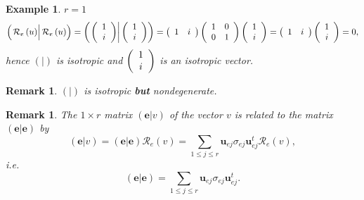 \documentclass[aps,preprint]{revtex4}%
\newtheorem{example}[theorem]{Example}
\newtheorem{remark}[theorem]{Remark}
\begin{document}
\begin{example}
$r=1$%
\[
\left(  \left.  \overset{}{\mathcal{R}_{e}\left(  u\right)  }\right\vert
\mathcal{R}_{e}\left(  u\right)  \right)  =\left(  \left.  \left(
\begin{array}
[c]{c}%
1\\
i
\end{array}
\right)  \right\vert \left(
\begin{array}
[c]{c}%
1\\
i
\end{array}
\right)  \right)  =\left(
\begin{array}
[c]{cc}%
1 & i
\end{array}
\right)  \left(
\begin{array}
[c]{cc}%
1 & 0\\
0 & 1
\end{array}
\right)  \left(
\begin{array}
[c]{c}%
1\\
i
\end{array}
\right)  =\left(
\begin{array}
[c]{cc}%
1 & i
\end{array}
\right)  \left(
\begin{array}
[c]{c}%
1\\
i
\end{array}
\right)  =0,
\]
hence $\left(  \left.  {}\right\vert \right)  $ is \emph{isotropic} and
$\left(
\begin{array}
[c]{c}%
1\\
i
\end{array}
\right)  $ is an isotropic vector.
\end{example}

\begin{remark}
$\left(  \left.  {}\right\vert \right)  $ is \emph{isotropic \textbf{but}
nondegenerate. }
\end{remark}

\begin{remark}
The $1\times r$ matrix $\left(  \left.  \mathbf{e}\right\vert v\right)  $ of
the vector $v$ is related to the matrix $\left(  \left.  \mathbf{e}\right\vert
\mathbf{e}\right)  $ by
\begin{equation}
\left(  \left.  \mathbf{e}\right\vert v\right)  =\left(  \left.
\mathbf{e}\right\vert \mathbf{e}\right)  \mathcal{R}_{e}\left(  v\right)
=\sum_{1\leq j\leq r}\mathbf{u}_{ej}\sigma_{ej}\mathbf{u}_{ej}^{t}%
\mathcal{R}_{e}\left(  v\right)  ,
\end{equation}
i.e.
\begin{equation}
\left(  \left.  \mathbf{e}\right\vert \mathbf{e}\right)  =\sum_{1\leq j\leq
r}\mathbf{u}_{ej}\sigma_{ej}\mathbf{u}_{ej}^{t}.
\end{equation}

\end{remark}
\end{document}
